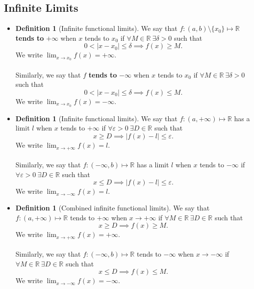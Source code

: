 \documentclass{article}
\newcommand{\R}{\mathbb{R}}
\newcommand{\?}{\stackrel{?}{=}}
\theoremstyle{definition} %
\newtheorem{definition}[subsection]{Definition} %
\begin{document}
\subsection{Infinite Limits}

\begin{itemize}
    \item[]
          \begin{definition}[Infinite functional limits]
              We say that $f: (a, b) \setminus \{x_0\} \mapsto \R$ \textbf{tends to} $+\infty$ when $x$ tends to $x_0$ if $\forall M \in \R \ \exists \delta > 0$ such that
              $$0 < |x - x_0| \leq \delta \implies f(x) \geq M.$$
              We write $\lim_{x \to x_0} f(x) = +\infty$. \\\\
              Similarly, we say that $f$ \textbf{tends to } $-\infty$ when $x$ tends to $x_0$ if $\forall M \in \R \ \exists \delta > 0$ such that
              $$0 < |x - x_0| \leq \delta \implies f(x) \leq M.$$
              We write $\lim_{x \to x_0} f(x) = -\infty$.
          \end{definition}
    \item[]
          \begin{definition}[Infinite functional limits]
              We say that $f: (a, +\infty) \mapsto \R$ has a limit $l$ when $x$ tends to $+\infty$ if $\forall \varepsilon > 0 \ \exists D \in \R$ such that
              $$x \geq D \implies |f(x) - l| \leq \varepsilon.$$
              We write $\lim_{x \to +\infty} f(x) = l$. \\\\
              Similarly, we say that $f: (-\infty, b) \mapsto \R$ has a limit $l$ when $x$ tends to $-\infty$ if $\forall \varepsilon > 0 \ \exists D \in \R$ such that
              $$x \leq D \implies |f(x) - l| \leq \varepsilon.$$
              We write $\lim_{x \to -\infty} f(x) = l$.
          \end{definition}
    \item[]
          \begin{definition}[Combined infinite functional limits]
              We say that $f: (a, +\infty) \mapsto \R$ tends to $+\infty$ when $x \rightarrow +\infty$ if $\forall M \in \R \ \exists D \in \R$ such that
              $$x \geq D \implies f(x) \geq M.$$
              We write $\lim_{x \to +\infty} f(x) = +\infty$. \\\\
              Similarly, we say that $f: (-\infty, b) \mapsto \R$ tends to $-\infty$ when $x \rightarrow -\infty$ if $\forall M \in \R \ \exists D \in \R$ such that
              $$x \leq D \implies f(x) \leq M.$$
              We write $\lim_{x \to -\infty} f(x) = -\infty$.
          \end{definition}
\end{itemize}
\end{document}
